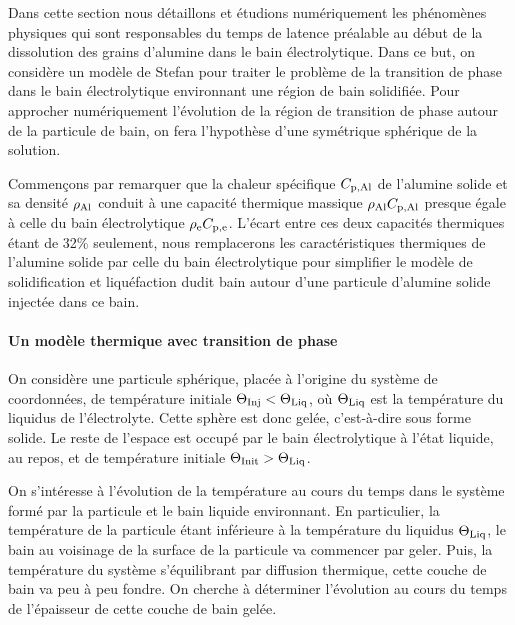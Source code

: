 Dans cette section nous détaillons et étudions numériquement les
phénomènes physiques qui sont responsables du temps de latence
préalable au début de la dissolution des grains d'alumine dans le bain
électrolytique. Dans ce but, on considère un modèle de Stefan pour
traiter le problème de la transition de phase dans le bain
électrolytique environnant une région de bain solidifiée. Pour
approcher numériquement l'évolution de la région de transition de
phase autour de la particule de bain, on fera l'hypothèse d'une
symétrique sphérique de la solution.

Commençons par remarquer que la chaleur spécifique $C_{\mathrm{p,Al}}$ de
l'alumine solide et sa densité $\rho_\mathrm{Al}$ conduit à une
capacité thermique massique $\rho_\mathrm{Al}C_{\mathrm{p,Al}}$ presque égale
à celle du bain électrolytique
$\rho_\mathrm{e}C_{\mathrm{p,e}}$. L'écart entre ces deux capacités
thermiques étant de \num{32}\% seulement, nous remplacerons les
caractéristiques thermiques de l'alumine solide par celle du bain
électrolytique pour simplifier le modèle de solidification et
liquéfaction dudit bain autour d'une particule d'alumine solide
injectée dans ce bain.


\paragraph{Un modèle thermique avec transition de phase}
On considère une particule sphérique, placée à l'origine du système de
coordonnées, de température initiale $\Theta_\text{Inj}<\Theta_\text{Liq}$, où $\Theta_\text{Liq}$ est la
température du liquidus de l'électrolyte. Cette sphère est donc gelée,
c'est-à-dire sous forme solide. Le reste de l'espace est occupé par le
bain électrolytique à l'état liquide, au repos, et de température
initiale $\Theta_\text{Init} > \Theta_\text{Liq}$.

On s'intéresse à l'évolution de la température au cours du temps dans
le système formé par la particule et le bain liquide environnant. En
particulier, la température de la particule étant inférieure à la
température du liquidus $\Theta_\text{Liq}$, le bain au voisinage de la surface de
la particule va commencer par geler. Puis, la température du système
s'équilibrant par diffusion thermique, cette couche de bain va peu à
peu fondre. On cherche à déterminer l'évolution au cours du temps de
l'épaisseur de cette couche de bain gelée.

